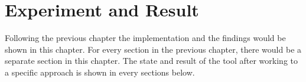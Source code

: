 \documentclass{standalone}
\begin{document}
\chapter{Experiment and Result}
Following the previous chapter the implementation and the findings would be shown in this chapter. For every section in the previous chapter, there would be a separate section in this chapter. The state and result of the tool after working to a specific approach is shown in every sections below.
\end{document}
